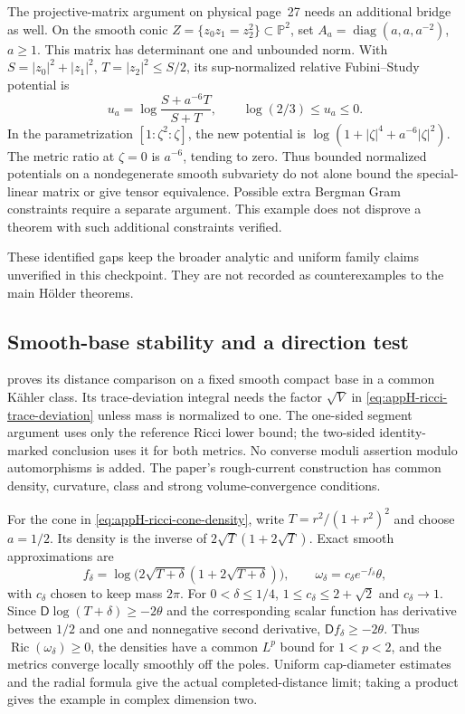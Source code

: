 The projective-matrix argument on physical page~27 needs
an additional bridge as well. On the smooth conic
\(Z=\{z_0z_1=z_2^2\}\subset\mathbb P^2\), set
\(A_a=\operatorname{diag}(a,a,a^{-2})\), \(a\geq1\).
This matrix has determinant one and unbounded norm.
With \(S=|z_0|^2+|z_1|^2\), \(T=|z_2|^2\leq S/2\),
its sup-normalized relative Fubini--Study potential is
\[
 u_a=\log\frac{S+a^{-6}T}{S+T},\qquad
 \log(2/3)\leq u_a\leq0.
\]
In the parametrization \([1:\zeta^2:\zeta]\), the
new potential is \(\log(1+|\zeta|^4+a^{-6}|\zeta|^2)\).
The metric ratio at \(\zeta=0\) is \(a^{-6}\), tending
to zero. Thus bounded normalized potentials on a
nondegenerate smooth subvariety do not alone bound the
special-linear matrix or give tensor equivalence.
Possible extra Bergman Gram constraints require a separate
argument. This example does not disprove a theorem with
such additional constraints verified.

These identified gaps keep the broader analytic and uniform
family claims unverified in this checkpoint. They are not
recorded as counterexamples to the main H\"older theorems.

\subsection{Smooth-base stability and a direction test}

\cite{GSS26GeometricStabilityV1} proves its distance
comparison on a fixed smooth compact base in a common
K\"ahler class. Its trace-deviation integral needs the
factor \(\sqrt V\) in
\eqref{eq:appH-ricci-trace-deviation} unless mass is
normalized to one. The one-sided segment argument uses
only the reference Ricci lower bound; the two-sided
identity-marked conclusion uses it for both metrics.
No converse moduli assertion modulo automorphisms is added.
The paper's rough-current construction has common density,
curvature, class and strong volume-convergence conditions.

For the cone in \eqref{eq:appH-ricci-cone-density}, write
\(T=r^2/(1+r^2)^2\) and choose \(a=1/2\). Its density
is the inverse of
\(2\sqrt T(1+2\sqrt T)\). Exact smooth approximations
are
\[
 f_\delta=\log\bigl(2\sqrt{T+\delta}
                         (1+2\sqrt{T+\delta})\bigr),
 \qquad
 \omega_\delta=c_\delta e^{-f_\delta}\theta,
\]
with \(c_\delta\) chosen to keep mass \(2\pi\).
For \(0<\delta\leq1/4\),
\(1\leq c_\delta\leq2+\sqrt2\) and
\(c_\delta\to1\). Since
\(\mathsf D\log(T+\delta)\geq-2\theta\) and
the corresponding scalar function has derivative between
\(1/2\) and one and nonnegative second derivative,
\(\mathsf Df_\delta\geq-2\theta\).
Thus \(\operatorname{Ric}(\omega_\delta)\geq0\),
the densities have a common \(L^p\) bound for \(1<p<2\),
and the metrics converge locally smoothly off the poles.
Uniform cap-diameter estimates and the radial formula give
the actual completed-distance limit; taking a product gives
the example in complex dimension two.

